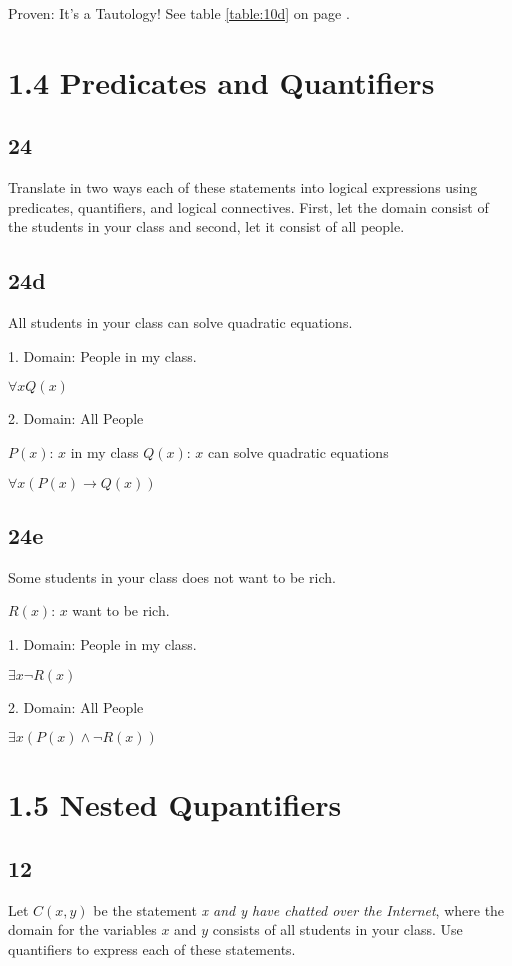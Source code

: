 \documentclass[12pt]{article}
\begin{document}
Proven: It's a Tautology! See table \ref{table:10d} on page \pageref{table:10d}.

\section{1.4 Predicates and Quantifiers}
\subsection{24}
Translate in two ways each of these statements into logical expressions using predicates, quantifiers, and logical connectives. First, let the domain consist of the students in your class and second, let it consist of all people.
\subsection{24d}
All students in your class can solve quadratic equations.

1. Domain: People in my class.

\begin{math}
  \forall{x} Q(x)
\end{math}

2. Domain: All People

$P(x)$: $x$ in my class
$Q(x)$: $x$ can solve quadratic equations

\begin{math}
  \forall{x}(P(x)\rightarrow Q(x))
\end{math}

\subsection{24e}
Some students in your class does not want to be rich.

$R(x)$: $x$ want to be rich.

1. Domain: People in my class.

$\exists{x} \neg R(x)$

2. Domain: All People

$\exists{x} (P(x) \wedge \neg R(x))$

\section{1.5 Nested Qupantifiers}
\subsection{12}
Let $C(x,y)$ be the statement \emph{x and y have chatted over the Internet}, where the domain for the variables $x$ and $y$ consists of all students in your class. Use quantifiers to express each of these statements.
\end{document}

